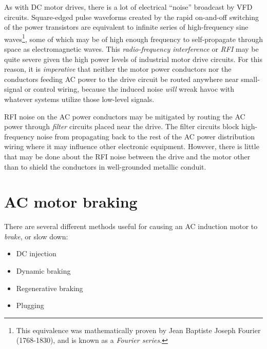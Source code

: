 \vskip 10pt

As with DC motor drives, there is a lot of electrical ``noise'' broadcast by VFD circuits.  Square-edged pulse waveforms created by the rapid on-and-off switching of the power transistors are equivalent to infinite series of high-frequency sine waves\footnote{This equivalence was mathematically proven by Jean Baptiste Joseph Fourier (1768-1830), and is known as a \textit{Fourier series}.}, some of which may be of high enough frequency to self-propagate through space as electromagnetic waves.  This \textit{radio-frequency interference} or \textit{RFI} may be quite severe given the high power levels of industrial motor drive circuits.  For this reason, it is \textit{imperative} that neither the motor power conductors nor the conductors feeding AC power to the drive circuit be routed anywhere near small-signal or control wiring, because the induced noise \textit{will} wreak havoc with whatever systems utilize those low-level signals.        

RFI noise on the AC power conductors may be mitigated by routing the AC power through \textit{filter} circuits placed near the drive.  The filter circuits block high-frequency noise from propagating back to the rest of the AC power distribution wiring where it may influence other electronic equipment.  However, there is little that may be done about the RFI noise between the drive and the motor other than to shield the conductors in well-grounded metallic conduit.












\filbreak
\section{AC motor braking}

There are several different methods useful for causing an AC induction motor to \textit{brake}, or slow down:

\begin{itemize}
\item DC injection
\item Dynamic braking
\item Regenerative braking
\item Plugging
\end{itemize}  

